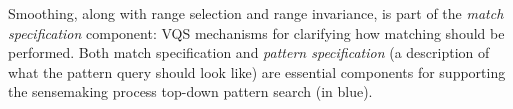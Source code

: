  Smoothing, along with range selection and range invariance, is part of the \emph{match specification} component: VQS mechanisms for clarifying how matching should be performed. Both match specification and \emph{pattern specification} (a description of what the pattern query should look like) are essential components for supporting the sensemaking process top-down pattern search (in blue).%
